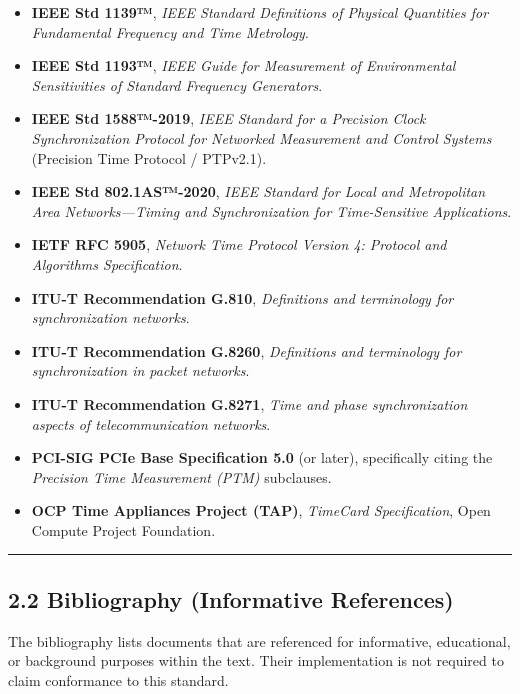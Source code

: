 \documentclass[
]{article}
\begin{document}
\begin{itemize}
\item
  \textbf{IEEE Std 1139™}, \emph{IEEE Standard Definitions of Physical
  Quantities for Fundamental Frequency and Time Metrology}.
\item
  \textbf{IEEE Std 1193™}, \emph{IEEE Guide for Measurement of
  Environmental Sensitivities of Standard Frequency Generators}.
\item
  \textbf{IEEE Std 1588™-2019}, \emph{IEEE Standard for a Precision
  Clock Synchronization Protocol for Networked Measurement and Control
  Systems} (Precision Time Protocol / PTPv2.1).
\item
  \textbf{IEEE Std 802.1AS™-2020}, \emph{IEEE Standard for Local and
  Metropolitan Area Networks---Timing and Synchronization for
  Time-Sensitive Applications}.
\item
  \textbf{IETF RFC 5905}, \emph{Network Time Protocol Version 4:
  Protocol and Algorithms Specification}.
\item
  \textbf{ITU-T Recommendation G.810}, \emph{Definitions and terminology
  for synchronization networks}.
\item
  \textbf{ITU-T Recommendation G.8260}, \emph{Definitions and
  terminology for synchronization in packet networks}.
\item
  \textbf{ITU-T Recommendation G.8271}, \emph{Time and phase
  synchronization aspects of telecommunication networks}.
\item
  \textbf{PCI-SIG PCIe Base Specification 5.0} (or later), specifically
  citing the \emph{Precision Time Measurement (PTM)} subclauses.
\item
  \textbf{OCP Time Appliances Project (TAP)}, \emph{TimeCard
  Specification}, Open Compute Project Foundation.
\end{itemize}

\begin{center}\rule{0.5\linewidth}{0.5pt}\end{center}

\subsection{2.2 Bibliography (Informative
References)}\label{bibliography-informative-references}

The bibliography lists documents that are referenced for informative,
educational, or background purposes within the text. Their
implementation is not required to claim conformance to this standard.
\end{document}
